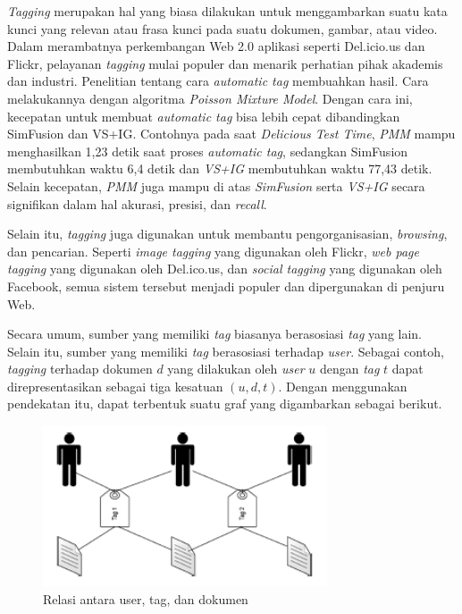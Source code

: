 \textit{Tagging} merupakan hal yang biasa dilakukan untuk menggambarkan suatu kata kunci yang relevan atau frasa kunci pada suatu dokumen, gambar, atau video. Dalam merambatnya perkembangan Web 2.0 aplikasi seperti Del.icio.us dan Flickr, pelayanan \textit{tagging} mulai populer dan menarik perhatian pihak akademis dan industri. Penelitian tentang cara \textit{automatic tag} membuahkan hasil. Cara melakukannya dengan algoritma \textit{Poisson Mixture Model}. Dengan cara ini, kecepatan untuk membuat \textit{automatic tag} bisa lebih cepat dibandingkan SimFusion dan VS+IG. Contohnya pada saat \textit{Delicious Test Time}, \textit{PMM} mampu menghasilkan 1,23 detik saat proses \textit{automatic tag}, sedangkan SimFusion membutuhkan waktu 6,4 detik dan \textit{VS+IG} membutuhkan waktu 77,43 detik. Selain kecepatan, \textit{PMM} juga mampu di atas \textit{SimFusion} serta \textit{VS+IG} secara signifikan dalam hal akurasi, presisi, dan \textit{recall}. \citep{song2008autotag}

Selain itu, \textit{tagging} juga digunakan untuk membantu pengorganisasian, \textit{browsing}, dan pencarian. Seperti \textit{image tagging} yang digunakan oleh Flickr, \textit{web page tagging} yang digunakan oleh Del.ico.us, dan \textit{social tagging} yang digunakan oleh Facebook, semua sistem tersebut menjadi populer dan dipergunakan di penjuru Web. \citep{sood2007tagassist}

Secara umum, sumber yang memiliki \textit{tag} biasanya berasosiasi \textit{tag} yang lain. Selain itu, sumber yang memiliki \textit{tag} berasosiasi terhadap \textit{user}. Sebagai contoh, \textit{tagging} terhadap dokumen $d$ yang dilakukan oleh \textit{user} $u$ dengan \textit{tag} $t$ dapat direpresentasikan sebagai tiga kesatuan $(u, d, t)$. Dengan menggunakan pendekatan itu, dapat terbentuk suatu graf yang digambarkan sebagai berikut. 

\begin{figure}[h]
    \centering
    \includegraphics[width=0.75\textwidth]{gambar/skema automatic tag.PNG}
    \caption{Relasi antara user, tag, dan dokumen \citep{song2011autotag}}
    \label{gambar:relasi_user_tag_dokumen}
\end{figure}

